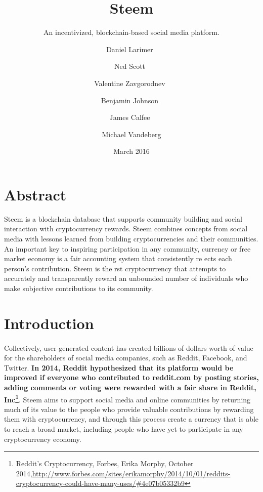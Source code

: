 \documentclass{article}
\title{Steem}
\subtitle{An incentivized, blockchain-based social media platform.}
\date{March 2016}
\author{
	Daniel Larimer\
	\and
	Ned Scott\
	\and
	Valentine Zavgorodnev\
	\and
	Benjamin Johnson\
	\and
	James Calfee\
	\and
	Michael Vandeberg
	}
\begin{document}
	\renewcommand \thesection{\roman{section}}

	\maketitle

	\newpage

	\section{Abstract}

	Steem is a blockchain database that supports community building and social interaction with cryptocurrency rewards. Steem combines concepts from social media with lessons learned from building cryptocurrencies and their communities. An important key to inspiring participation in any community, currency or free market economy is a fair accounting system that consistently re ects each person's contribution. Steem is the  rst cryptocurrency that attempts to accurately and transparently reward an unbounded number of individuals who make subjective contributions to its community.

	\newpage

	\tableofcontents

	\newpage

	\setcounter{section}{0}

	\renewcommand \thesection{\arabic{section}}

	\section{Introduction}

	    \paragraph{}
			Collectively, user-generated content has created billions of dollars worth of value for the shareholders of social media companies, such as Reddit, Facebook, and Twitter. \textbf{In 2014, Reddit hypothesized that its platform would be improved if everyone who contributed to reddit.com by posting stories, adding comments or voting were rewarded with a fair share in Reddit, Inc\footnote{Reddit's Cryptocurrency, Forbes, Erika Morphy, October 2014,\newline\url{http://www.forbes.com/sites/erikamorphy/2014/10/01/reddits-cryptocurrency-could-have-many-uses/\#4e07b05332b9}}}. Steem aims to support social media and online communities by returning much of its value to the people who provide valuable contributions by rewarding them with cryptocurrency, and through this process create a currency that is able to reach a broad market, including people who have yet to participate in any cryptocurrency economy.
\end{document}
